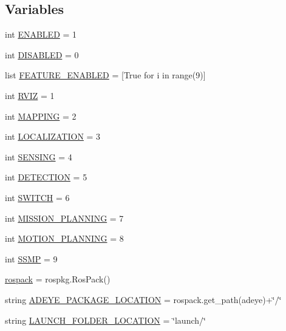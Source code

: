 \subsection*{Variables}
\begin{DoxyCompactItemize}
\item 
int \hyperlink{namespacemanager_ad92224ba3bccfba54f5d53ee9e9f0e06}{E\+N\+A\+B\+L\+ED} = 1
\item 
int \hyperlink{namespacemanager_acc1a242f79d4757ccec1eafa25991b69}{D\+I\+S\+A\+B\+L\+ED} = 0
\item 
list \hyperlink{namespacemanager_a140ec9bdd4f59ede61032dec9dbd20e3}{F\+E\+A\+T\+U\+R\+E\+\_\+\+E\+N\+A\+B\+L\+ED} = \mbox{[}True for i in range(9)\mbox{]}
\item 
int \hyperlink{namespacemanager_a00b72dc43f7bcfd7f320277e59b9d565}{R\+V\+IZ} = 1
\item 
int \hyperlink{namespacemanager_a0246d765371fcedd6b0c05ee3e97c3ad}{M\+A\+P\+P\+I\+NG} = 2
\item 
int \hyperlink{namespacemanager_a716836983d025722ec1a015848efec7f}{L\+O\+C\+A\+L\+I\+Z\+A\+T\+I\+ON} = 3
\item 
int \hyperlink{namespacemanager_a07571ba2de9edb4dae0269f01bc691cc}{S\+E\+N\+S\+I\+NG} = 4
\item 
int \hyperlink{namespacemanager_a341e1745be0eb2382da0ea818411441c}{D\+E\+T\+E\+C\+T\+I\+ON} = 5
\item 
int \hyperlink{namespacemanager_a2dfd2e80a686fee05e1ade0e51fa5eee}{S\+W\+I\+T\+CH} = 6
\item 
int \hyperlink{namespacemanager_aa7776000dd1f368ae9e4672273662506}{M\+I\+S\+S\+I\+O\+N\+\_\+\+P\+L\+A\+N\+N\+I\+NG} = 7
\item 
int \hyperlink{namespacemanager_a6e5eb6ddb9305d2a2e9bafc6cf3a29b9}{M\+O\+T\+I\+O\+N\+\_\+\+P\+L\+A\+N\+N\+I\+NG} = 8
\item 
int \hyperlink{namespacemanager_a7c64b0011b346aa00685017ed03a6b72}{S\+S\+MP} = 9
\item 
\hyperlink{namespacemanager_af079b1840e898a44e8a8794f632c6747}{rospack} = rospkg.\+Ros\+Pack()
\item 
string \hyperlink{namespacemanager_a6b9923a9dbb3360028e139c3391d3a26}{A\+D\+E\+Y\+E\+\_\+\+P\+A\+C\+K\+A\+G\+E\+\_\+\+L\+O\+C\+A\+T\+I\+ON} = rospack.\+get\+\_\+path(\textquotesingle{}adeye\textquotesingle{})+\char`\"{}/\char`\"{}
\item 
string \hyperlink{namespacemanager_aade405cb0881d91b45085d7bc0f392fa}{L\+A\+U\+N\+C\+H\+\_\+\+F\+O\+L\+D\+E\+R\+\_\+\+L\+O\+C\+A\+T\+I\+ON} = \char`\"{}launch/\char`\"{}

\end{DoxyCompactItemize}
